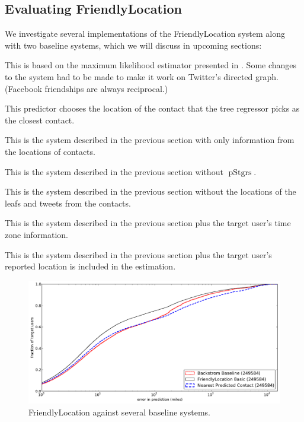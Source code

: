 \documentclass{sig-alternate}
\DeclareMathOperator{\pStrangers}{pStgrs}
\begin{document}
\subsection{Evaluating FriendlyLocation}
We investigate several implementations of the FriendlyLocation system along
with two baseline systems, which we will discuss in upcoming sections:
\begin{description}
    \setlength{\itemsep}{0pt}
\item[Baseline] This is based on the maximum likelihood estimator presented in
    \cite{backstrom2010find}. Some changes to the system had to be made to make it
    work on Twitter's directed graph. (Facebook friendships are always
    reciprocal.)
\item[Nearest Contact] This predictor chooses the location of the contact that
    the tree regressor picks as the closest contact.
\item[FriendlyLocation Basic] This is the system described in the previous
    section with only information from the locations of contacts.
\item[FriendlyLocation - Strangers] This is the system described in the previous
    section without $\pStrangers$.
\item[FriendlyLocation - Leafs] This is the system described in the previous
    section without the locations of the leafs and tweets from the contacts.
\ifdefined\THESIS
\item[FriendlyLocation + Time Zone] This is the system described in the previous
    section plus the target user's time zone information.
\item[FriendlyLocation + Location] This is the system described in the previous
    section plus the target user's reported location is included in the
    estimation.
\fi
\end{description}

\begin{figure}[tb]
\centering
\includegraphics[width=.9\linewidth]{figures/fl_basic.pdf}
\caption{
    FriendlyLocation against several baseline systems.
}
\label{fig:results}
\vspace{-2pt}
\end{figure}
\end{document}
